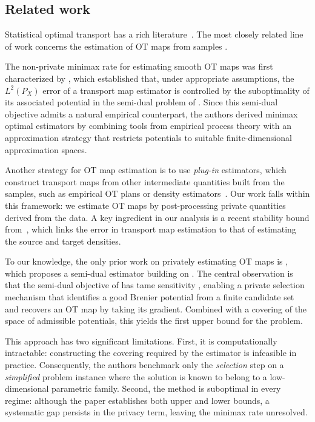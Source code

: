 \documentclass{article}
\newcommand{\1}{\mathds{1}}
\theoremstyle{plain}
\theoremstyle{definition}
\theoremstyle{remark}
\begin{document}
\subsection{Related work}


Statistical optimal transport has a rich literature~\cite{DBLP:conf/aistats/ForrowHNRSW19,DBLP:conf/nips/PerrotCFH16,DBLP:conf/iclr/SeguyDFCRB18,NIPS2017_0070d23b,DBLP:conf/pkdd/CourtyFT14,courty2017OTDomainAdapt}. The most closely related line of work concerns the estimation of OT maps from samples \cite{hutter2021minimax,Manole2024Plugin,pooladian2021entropic}.

The non-private minimax rate for estimating smooth OT maps was first characterized by \cite{hutter2021minimax}, which established that, under appropriate assumptions, the $L^2(P_X)$ error of a transport map estimator is controlled by the suboptimality of its associated potential in the semi-dual problem of . Since this semi-dual objective admits a natural empirical counterpart, the authors derived minimax optimal estimators by combining tools from empirical process theory with an approximation strategy that restricts potentials to suitable finite-dimensional approximation spaces.

Another strategy for OT map estimation is to use \emph{plug-in} estimators, which construct transport maps from other intermediate quantities built from the samples, such as empirical OT plans or density estimators~\cite{Manole2024Plugin,pooladian2021entropic}. Our work falls within this framework: we estimate OT maps by post-processing private quantities derived from the data. A key ingredient in our analysis is a recent stability bound from~\cite{balakrishnan2025stabilityboundssmoothoptimal}, which links the error in transport map estimation to that of estimating the source and target densities.

To our knowledge, the only prior work on privately estimating OT maps is \cite{lalanne2025PrivateOTMaps}, which proposes a semi-dual estimator building on \cite{hutter2021minimax}. The central observation is that the semi-dual objective of \cite{hutter2021minimax} has tame sensitivity \cite{dwork2006calibrating}, enabling a private selection mechanism that identifies a good Brenier potential from a finite candidate set and recovers an OT map by taking its gradient. Combined with a covering of the space of admissible potentials, this yields the first upper bound for the problem.

This approach has two significant limitations. First, it is computationally intractable: constructing the covering required by the estimator is infeasible in practice. Consequently, the authors benchmark only the \emph{selection} step on a \emph{simplified} problem instance where the solution is known to belong to a low-dimensional parametric family. Second, the method is suboptimal in every regime: although the paper establishes both upper and lower bounds, a systematic gap persists in the privacy term, leaving the minimax rate unresolved.
\end{document}
